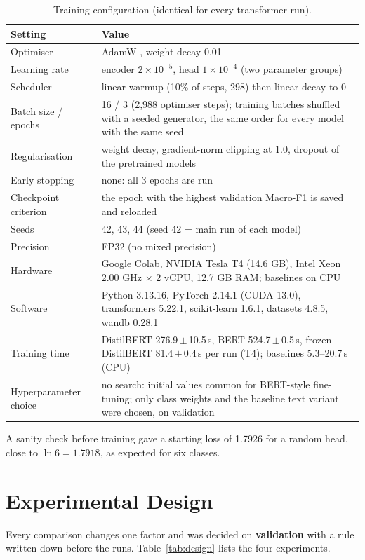 \documentclass[11pt,a4paper]{article}
\newcommand{\pmstd}[2]{#1\,$\pm$\,#2}
\begin{document}
\begin{table}[H]
\centering
\caption{Training configuration (identical for every transformer run).}
\label{tab:setup}
\begin{tabularx}{\textwidth}{@{}p{4.3cm}L@{}}
\toprule
\textbf{Setting} & \textbf{Value}\\
\midrule
Optimiser & AdamW \cite{loshchilov2019}, weight decay 0.01\\
Learning rate & encoder $2\times10^{-5}$, head $1\times10^{-4}$ (two parameter groups)\\
Scheduler & linear warmup (10\% of steps, 298) then linear decay to 0\\
Batch size / epochs & 16 / 3 (2,988 optimiser steps); training batches shuffled with a seeded generator, the same order for every model with the same seed\\
Regularisation & weight decay, gradient-norm clipping at 1.0, dropout of the pretrained models\\
Early stopping & none: all 3 epochs are run\\
Checkpoint criterion & the epoch with the highest validation Macro-F1 is saved and reloaded\\
Seeds & 42, 43, 44 (seed 42 = main run of each model)\\
Precision & FP32 (no mixed precision)\\
Hardware & Google Colab, NVIDIA Tesla T4 (14.6 GB), Intel Xeon 2.00 GHz $\times$ 2 vCPU, 12.7 GB RAM; baselines on CPU\\
Software & Python 3.13.16, PyTorch 2.14.1 (CUDA 13.0), transformers 5.22.1, scikit-learn 1.6.1, datasets 4.8.5, wandb 0.28.1\\
Training time & DistilBERT \pmstd{276.9}{10.5}\,s, BERT \pmstd{524.7}{0.5}\,s, frozen DistilBERT \pmstd{81.4}{0.4}\,s per run (T4); baselines 5.3--20.7\,s (CPU)\\
Hyperparameter choice & no search: initial values common for BERT-style fine-tuning; only class weights and the baseline text variant were chosen, on validation\\
\bottomrule
\end{tabularx}
\end{table}

A sanity check before training gave a starting loss of 1.7926 for a random head, close to $\ln 6 = 1.7918$, as expected for six classes.

\section{Experimental Design}
\label{sec:design}
Every comparison changes one factor and was decided on \textbf{validation} with a rule written down before the runs. Table~\ref{tab:design} lists the four experiments.
\end{document}
